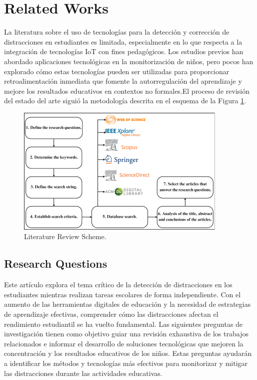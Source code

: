 \documentclass[a4paper,fleqn]{cas-sc}
\begin{document}
	\section{Related Works}
	\label{seccion:Tres}
		La literatura sobre el uso de tecnologías para la detección y corrección de distracciones en estudiantes es limitada, especialmente en lo que respecta a la integración de tecnologías IoT con fines pedagógicos. Los estudios previos han abordado aplicaciones tecnológicas en la monitorización de niños, pero pocos han explorado cómo estas tecnologías pueden ser utilizadas para proporcionar retroalimentación inmediata que fomente la autorregulación del aprendizaje y mejore los resultados educativos en contextos no formales.El proceso de revisión del estado del arte siguió la metodología descrita en el esquema de la Figura \ref{fig:LRS}.
		
		\begin{figure}[h]
			\includegraphics[width=\textwidth]{Figure_1}
			\caption{Literature Review Scheme.}
			\label{fig:LRS}
		\end{figure}   
		
		\subsection{Research Questions}
			Este artículo explora el tema crítico de la detección de distracciones en los estudiantes mientras realizan tareas escolares de forma independiente. Con el aumento de las herramientas digitales de educación y la necesidad de estrategias de aprendizaje efectivas, comprender cómo las distracciones afectan el rendimiento estudiantil se ha vuelto fundamental. Las siguientes preguntas de investigación tienen como objetivo guiar una revisión exhaustiva de los trabajos relacionados e informar el desarrollo de soluciones tecnológicas que mejoren la concentración y los resultados educativos de los niños. Estas preguntas ayudarán a identificar los métodos y tecnologías más efectivos para monitorizar y mitigar las distracciones durante las actividades educativas.
		
\end{document}
